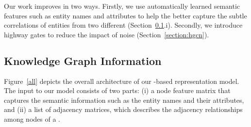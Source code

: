  Our work improves \RGCNs in two ways. Firstly, we use automatically learned semantic features such as entity names and attributes to
 help the \RGCN better capture the subtle correlations of entities from two different \KGs (Section~\ref{section:rgcn}.i).
    Secondly, we introduce highway gates to reduce the impact of noise (Section~\ref{section:hgcn}).




	



	
	\subsection{Knowledge Graph Information}
	\label{section:rgcn}	


    Figure~\ref{all} depicts the overall architecture of our \RGCN-based \KG representation model. 	
  	The input to our model consists of two parts: (i) a node feature matrix that captures the semantic information such as the entity
  names and their attributes, and (ii) a list of adjacency matrices, which describes the adjacency relationships among nodes of a \KG.


